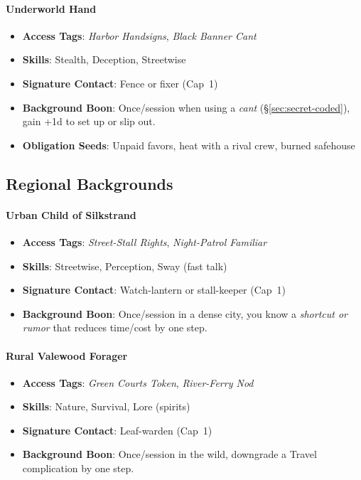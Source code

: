 \paragraph{Underworld Hand}
\begin{itemize}
\item \textbf{Access Tags}: \textit{Harbor Handsigns}, \textit{Black Banner Cant}
\item \textbf{Skills}: Stealth, Deception, Streetwise
\item \textbf{Signature Contact}: Fence or fixer (Cap~1)
\item \textbf{Background Boon}: Once/session when using a \emph{cant} (\S\ref{sec:secret-coded}), gain +1d to set up or slip out.
\item \textbf{Obligation Seeds}: Unpaid favors, heat with a rival crew, burned safehouse
\end{itemize}

\subsection*{Regional Backgrounds}

\paragraph{Urban Child of Silkstrand}
\begin{itemize}
\item \textbf{Access Tags}: \textit{Street-Stall Rights}, \textit{Night-Patrol Familiar}
\item \textbf{Skills}: Streetwise, Perception, Sway (fast talk)
\item \textbf{Signature Contact}: Watch-lantern or stall-keeper (Cap~1)
\item \textbf{Background Boon}: Once/session in a dense city, you know a \emph{shortcut or rumor} that reduces time/cost by one step.
\end{itemize}

\paragraph{Rural Valewood Forager}
\begin{itemize}
\item \textbf{Access Tags}: \textit{Green Courts Token}, \textit{River-Ferry Nod}
\item \textbf{Skills}: Nature, Survival, Lore (spirits)
\item \textbf{Signature Contact}: Leaf-warden (Cap~1)
\item \textbf{Background Boon}: Once/session in the wild, downgrade a Travel complication by one step.
\end{itemize}

